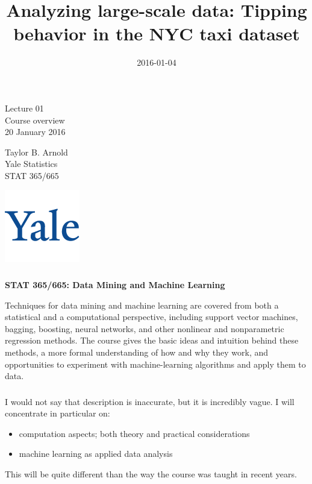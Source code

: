\documentclass[xetex,mathserif,serif,aspectratio=169]{beamer}
\title{Analyzing large-scale data: Tipping behavior in the NYC taxi dataset}
\date{2016-01-04}
\begin{document}
\begin{frame}[fragile] \frametitle{} \oldB \small

\vfill

{\fontsize{0.7cm}{0cm}\selectfont Lecture 01 \\\vspace{0.2cm} Course overview}\\\vspace{0.5cm}
20 January 2016

\vspace{2cm}

\begin{minipage}{0.6\textwidth}
Taylor B. Arnold \\
Yale Statistics \\
STAT 365/665
\end{minipage}
\hfill
\begin{minipage}{0.3\textwidth}\raggedleft
\includegraphics[scale=0.3]{../yale-logo.png}
\end{minipage}%

\end{frame}

\begin{frame}[fragile] \frametitle{} \oldB \small

\textbf{STAT 365/665: Data Mining and Machine Learning} \vspace{12pt}

Techniques for data mining and machine learning are covered from both a statistical and a computational perspective, including support vector machines, bagging, boosting, neural networks, and other nonlinear and nonparametric regression methods. The course gives the basic ideas and intuition behind these methods, a more formal understanding of how and why they work, and opportunities to experiment with machine-learning algorithms and apply them to data.

\end{frame}

\begin{frame}[fragile] \frametitle{} \oldB \small

I would not say that description is inaccurate, but it is incredibly vague.
I will concentrate in particular on:

\begin{itemize}
\item computation aspects; both theory and practical considerations
\item machine learning as applied data analysis
\end{itemize}

This will be quite different than the way the course was taught in recent years.

\end{frame}
\end{document}
